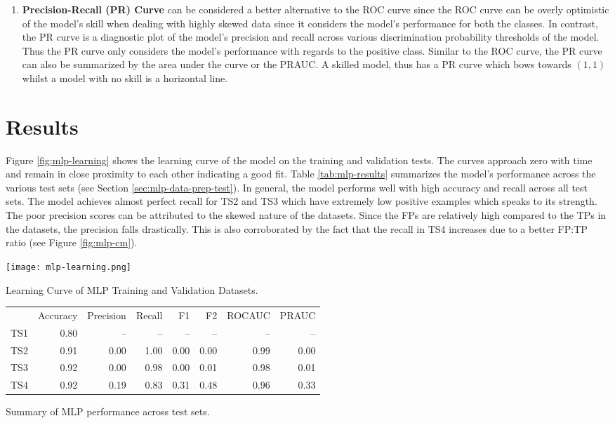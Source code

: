 \begin{enumerate}
\item \textbf{Precision-Recall (PR) Curve} can be considered a better
  alternative to the ROC curve since the ROC curve can be overly
  optimistic of the model's skill when dealing with highly skewed data
  since it considers the model's performance for both the classes. In
  contrast, the PR curve is a diagnostic plot of the model's precision
  and recall across various discrimination probability thresholds of
  the model. Thus the PR curve only considers the model's performance
  with regards to the positive class. Similar to the ROC curve, the PR
  curve can also be summarized by the area under the curve or the
  PRAUC. A skilled model, thus has a PR curve which bows towards
  $(1,1)$ whilst a model with no skill is a horizontal line.
\end{enumerate}

\section{Results}
\label{sec:mlp-disc}

Figure \ref{fig:mlp-learning} shows the learning curve of the model on
the training and validation tests. The curves approach zero with time
and remain in close proximity to each other indicating a good fit.
Table \ref{tab:mlp-results} summarizes the model's performance across
the various test sets (see Section \ref{sec:mlp-data-prep-test}). In
general, the model performs well with high accuracy and recall across
all test sets. The model achieves almost perfect recall for TS2 and
TS3 which have extremely low positive examples which speaks to its
strength. The poor precision scores can be attributed to the skewed
nature of the datasets. Since the FPs are relatively high compared to
the TPs in the datasets, the precision falls drastically. This is also
corroborated by the fact that the recall in TS4 increases due to a
better FP:TP ratio (see Figure \ref{fig:mlp-cm}).

\begin{minipage}{0.24\textwidth}
  \centering
  \texttt{[image: mlp-learning.png]}
  \caption{Learning Curve of MLP Training and Validation Datasets.}
  \label{fig:mlp-learning}
\end{minipage}
\begin{minipage}{0.74\textwidth}
    \centering
    \begin{tabular}{rrrrrrrr}
      \hline
      & Accuracy & Precision & Recall & F1 & F2 & ROCAUC & PRAUC \\
      TS1 & 0.80 & -- & -- & -- & -- & -- & -- \\
      TS2 & 0.91 & 0.00 & 1.00 & 0.00 & 0.00 & 0.99 & 0.00 \\
      TS3 & 0.92 & 0.00 & 0.98 & 0.00 & 0.01 & 0.98 & 0.01 \\
      TS4 & 0.92 & 0.19 & 0.83 & 0.31 & 0.48 & 0.96 & 0.33 \\
      \hline
    \end{tabular}
    \caption{Summary of MLP performance across test sets.}
    \label{tab:mlp-results}
\end{minipage}

